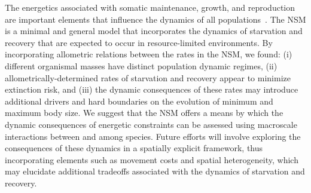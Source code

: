 \documentclass{pnastwo}
\begin{document}
\begin{article}



The energetics associated with somatic maintenance, growth, and reproduction are important elements that influence the dynamics of all populations~\cite{Stearns:1989ip}.
The NSM is a minimal and general model that incorporates the dynamics of starvation and recovery that are expected to occur in resource-limited environments.
By incorporating allometric relations between the rates in the NSM, we found: (i) different organismal masses have distinct population dynamic regimes, (ii) allometrically-determined rates of starvation and recovery appear to minimize extinction risk, and (iii) the dynamic consequences of these rates may introduce additional drivers and hard boundaries on the evolution of minimum and maximum body size.
We suggest that the NSM offers a means by which the dynamic consequences of energetic constraints can be assessed using macroscale interactions between and among species.
Future efforts will involve exploring the consequences of these dynamics in a spatially explicit framework, thus incorporating elements such as movement costs and spatial heterogeneity, which may elucidate additional tradeoffs associated with the dynamics of starvation and recovery.

%
%
%
%
%
%
%
%
%
%
%
%
%


\end{article}
\end{document}
